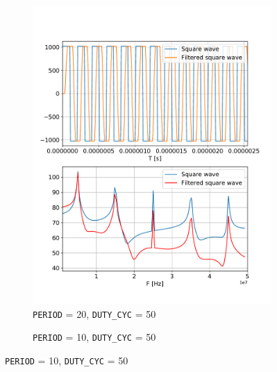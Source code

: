 \documentclass[a4paper,11pt]{article}
\begin{document}
\begin{figure}[H]
    \centering
    \label{fig:plots}
    \begin{subfigure}{0.49\textwidth}
     \caption{\texttt{PERIOD} = 20, \texttt{DUTY\_CYC} = 50}
      \includegraphics[width=1\linewidth]{./Figure/P20_D50.pdf}
    \end{subfigure}
    \begin{subfigure}{0.49\textwidth}
      \caption{\texttt{PERIOD} = 10, \texttt{DUTY\_CYC} = 50}

\end{subfigure}
\end{figure}
\end{document}
